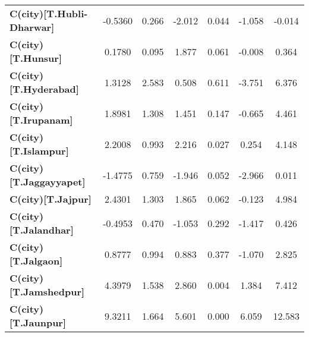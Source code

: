 \begin{center}
\begin{tabular}{lcccccc}
\textbf{C(city)[T.Hubli-Dharwar]}                                                                   &      -0.5360  &        0.266     &    -2.012  &         0.044        &       -1.058    &       -0.014     \\
\textbf{C(city)[T.Hunsur]}                                                                          &       0.1780  &        0.095     &     1.877  &         0.061        &       -0.008    &        0.364     \\
\textbf{C(city)[T.Hyderabad]}                                                                       &       1.3128  &        2.583     &     0.508  &         0.611        &       -3.751    &        6.376     \\
\textbf{C(city)[T.Irupanam]}                                                                        &       1.8981  &        1.308     &     1.451  &         0.147        &       -0.665    &        4.461     \\
\textbf{C(city)[T.Islampur]}                                                                        &       2.2008  &        0.993     &     2.216  &         0.027        &        0.254    &        4.148     \\
\textbf{C(city)[T.Jaggayyapet]}                                                                     &      -1.4775  &        0.759     &    -1.946  &         0.052        &       -2.966    &        0.011     \\
\textbf{C(city)[T.Jajpur]}                                                                          &       2.4301  &        1.303     &     1.865  &         0.062        &       -0.123    &        4.984     \\
\textbf{C(city)[T.Jalandhar]}                                                                       &      -0.4953  &        0.470     &    -1.053  &         0.292        &       -1.417    &        0.426     \\
\textbf{C(city)[T.Jalgaon]}                                                                         &       0.8777  &        0.994     &     0.883  &         0.377        &       -1.070    &        2.825     \\
\textbf{C(city)[T.Jamshedpur]}                                                                      &       4.3979  &        1.538     &     2.860  &         0.004        &        1.384    &        7.412     \\
\textbf{C(city)[T.Jaunpur]}                                                                         &       9.3211  &        1.664     &     5.601  &         0.000        &        6.059    &       12.583     \\

\end{tabular}
\end{center}
